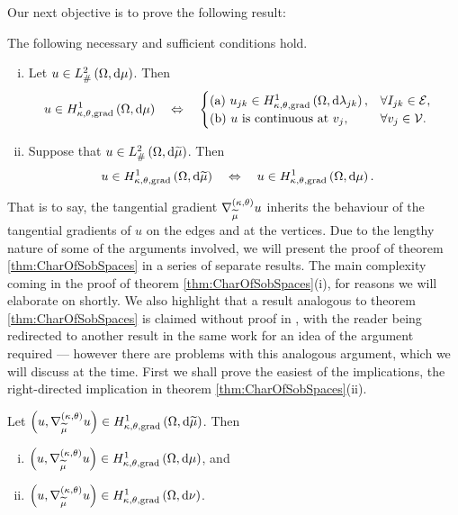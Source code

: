 Our next objective is to prove the following result:
\begin{theorem} \label{thm:CharOfSobSpaces}
	The following necessary and sufficient conditions hold.
	\begin{enumerate}[(i)]
		\item Let $u\in L^2_{\#}\left( \Omega,\mathrm{d} \mu \right)$.
		Then
		\begin{align}
			u\in H^1_{\kappa,\theta,\mathrm{grad}}\left( \Omega, \mathrm{d}\mu \right) 
			&\quad\Leftrightarrow\quad 
			\begin{cases} 
				\mathrm{(a)} \ u_{jk}\in H^1_{\kappa,\theta,\mathrm{grad}}\left( \Omega, \mathrm{d}\lambda_{jk} \right), & \forall I_{jk}\in\mathcal{E}, \\
				\mathrm{(b)} \ u \text{ is continuous at } v_j, & \forall v_j\in\mathcal{V}.
			\end{cases}
		\end{align}
		\item Suppose that $u\in L^2_{\#}\left( \Omega,\mathrm{d} \widetilde{\mu} \right)$.
		Then
		\begin{align*}
			u\in H^1_{\kappa,\theta,\mathrm{grad}}\left( \Omega, \mathrm{d}\widetilde{\mu} \right) 
			&\quad\Leftrightarrow\quad 
			u\in H^1_{\kappa,\theta,\mathrm{grad}}\left( \Omega, \mathrm{d}\mu \right).	
		\end{align*}
	\end{enumerate}
\end{theorem}
That is to say, the tangential gradient $\nabla^{\left( \kappa, \theta \right)}_{\widetilde{\mu}}u$ inherits the behaviour of the tangential gradients of $u$ on the edges and at the vertices.
Due to the lengthy nature of some of the arguments involved, we will present the proof of theorem \ref{thm:CharOfSobSpaces} in a series of separate results.
The main complexity coming in the proof of theorem \ref{thm:CharOfSobSpaces}(i), for reasons we will elaborate on shortly.
We also highlight that a result analogous to theorem \ref{thm:CharOfSobSpaces} is claimed without proof in \cite{zhikov2002homogenization}, with the reader being redirected to another result in the same work for an idea of the argument required --- however there are problems with this analogous argument, which we will discuss at the time.
First we shall prove the easiest of the implications, the right-directed implication in theorem \ref{thm:CharOfSobSpaces}(ii).
\begin{theorem} \label{thm:dddmesTangGradImplication}
	Let $\left( u,\nabla^{\left( \kappa, \theta \right)}_{\widetilde{\mu}}u \right)\in H^1_{\kappa,\theta,\mathrm{grad}}\left( \Omega, \mathrm{d}\widetilde{\mu} \right)$.
	Then
	\begin{enumerate}[(i)]
		\item $\left( u,\nabla^{\left( \kappa, \theta \right)}_{\widetilde{\mu}}u \right)\in H^1_{\kappa,\theta,\mathrm{grad}}\left( \Omega, \mathrm{d}\mu \right)$, and
		\item $\left( u,\nabla^{\left( \kappa, \theta \right)}_{\widetilde{\mu}}u \right)\in H^1_{\kappa,\theta,\mathrm{grad}}\left( \Omega, \mathrm{d}\nu \right)$.
	\end{enumerate}
\end{theorem}
